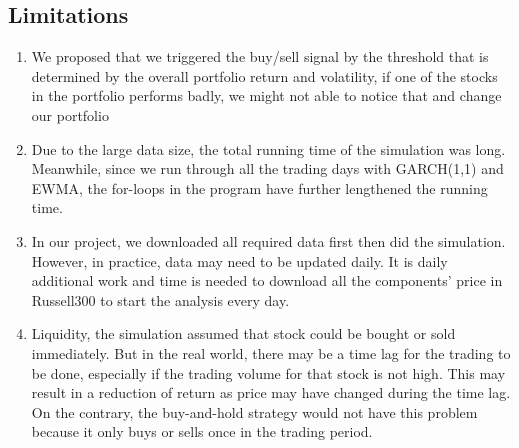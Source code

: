\documentclass[11pts]{article}
\begin{document}
\subsection{Limitations}
\label{sec:org408610d}
\begin{enumerate}
\item We proposed that we triggered the buy/sell signal by the threshold that is determined by the overall portfolio return and volatility, if one of the stocks in the portfolio performs badly, we might not able to notice that and change our portfolio

\item Due to the large data size, the total running time of the simulation was long. Meanwhile, since we run through all the trading days with GARCH(1,1) and EWMA,  the for-loops in the program have further lengthened the running time.

\item In our project, we downloaded all required data first then did the simulation. However, in practice, data may need to be updated daily. It is daily additional work and time is needed to download all the components’ price in Russell300 to start the analysis every day.

\item Liquidity,  the simulation assumed that stock could be bought or sold immediately. But in the real world, there may be a time lag for the trading to be done, especially if the trading volume for that stock is not high. This may result in a reduction of return as price may have changed during the time lag. On the contrary, the buy-and-hold strategy would not have this problem because it only buys or sells once in the trading period.
\end{enumerate}
\end{document}
